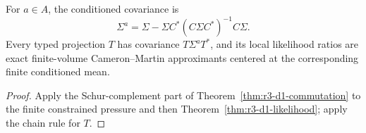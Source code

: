 \begin{corollary}
\label{cor:r3-d1-conditioned}
For \(a\in A\), the conditioned covariance is
\[
 \Sigma^a
 =\Sigma-\Sigma C^*(C\Sigma C^*)^{-1}C\Sigma.
\]
Every typed projection \(T\) has covariance \(T\Sigma^aT^*\), and its local
likelihood ratios are exact finite-volume Cameron--Martin approximants centered
at the corresponding finite conditioned mean.
\end{corollary}

\begin{proof}
Apply the Schur-complement part of
Theorem~\ref{thm:r3-d1-commutation} to the finite constrained pressure and then
Theorem~\ref{thm:r3-d1-likelihood}; apply the chain rule for \(T\).
\end{proof}
